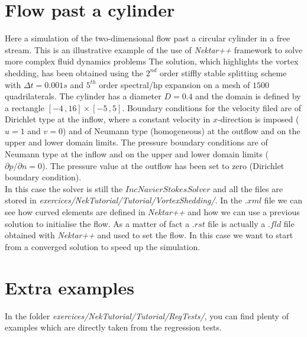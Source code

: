 \documentclass[12pt]{article}
\begin{document}
\section{Flow past a cylinder}
Here a simulation of the two-dimensional flow past a circular cylinder in
a free stream.
This is an illustrative example of the use of \emph{Nektar++}
framework to solve more complex fluid dynamics problems
The solution, which highlights the vortex shedding, has been obtained using the $2^{nd}$
order stiffly stable splitting scheme with $\Delta t = 0.001 s$ and
$5^{th}$ order spectral/hp expansion on a mesh of $1500$
quadrilaterals. The cylinder has a diameter $D = 0.4$ and the domain
is defined by a rectangle $[-4\,,16] \times
[-5\,,5]$. Boundary conditions for the velocity filed
are of Dirichlet type at the inflow, where a constant velocity in
$x$-direction is imposed ($u = 1$ and $v = 0$) and of Neumann type
(homogeneous) at the outflow and on the upper and lower domain
limits. The pressure boundary conditions are of Neumann type at the inflow and on the upper and lower domain limits ($\partial p/\partial n = 0$). The pressure
value at the outflow has been set to zero (Dirichlet boundary  condition).\\

\noindent
In this case the solver is still the $IncNavierStokesSolver$ and all the files are stored in \emph{exercices/NekTutorial/Tutorial/VortexShedding/}.
In the $.xml$ file we can see how curved elements are defined in \emph{Nektar++} and how we can use a previous solution to initialise the flow.
As a matter of fact a $.rst$ file is actually a $.fld$ file obtained with \emph{Nektar++} and used to set the flow. In this case we want to start from a converged solution to speed
up the simulation.

\section{Extra examples}

In the folder \emph{exercices/NekTutorial/Tutorial/RegTests/}, you can find plenty of examples which are directly taken from the regression tests.
\end{document}
